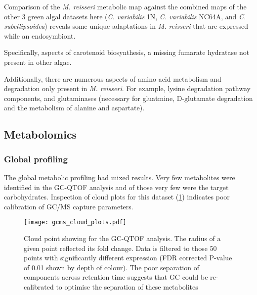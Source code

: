 Comparison of the \textit{M. reisseri} metabolic map against the combined
maps of the other 3 green algal datasets here (\textit{C. variabilis} 1N, 
\textit{C. variabilis} NC64A, and \textit{C. subellipsoidea}) reveals
some unique adaptations in \textit{M. reisseri} that are expressed while 
an endosymbiont.  

Specifically, aspects of carotenoid biosynthesis, a missing fumarate hydratase
not present in other algae.  

Additionally, there are numerous aspects of amino acid metabolism and degradation
only present in \textit{M. reisseri}. For example, lysine degradation pathway components, 
and glutaminases (necessary for gluatmine, D-glutamate degradation and the metabolism of
alanine and aspartate). 

\subsection{Metabolomics} 

\subsubsection{Global profiling}

The global metabolic profiling had mixed results.
Very few metabolites were identified in the GC-QTOF
analysis and of those very few were the target carbohydrates.
Inspection of cloud plots for this dataset (\cref{fig:gcms_clouds})
indicates poor calibration of GC/MS capture parameters. 

\begin{figure}
    \centering
    \texttt{[image: gcms\_cloud\_plots.pdf]}
    \caption[GC-QTOF Cloud Plot]{Cloud point showing for the GC-QTOF analysis. 
    The radius of a given point reflected its fold change.
    Data is filtered to those 50 points with significantly 
different expression (FDR corrected P-value of 0.01 shown by 
depth of colour).  The poor separation of components across
retention time suggests that GC could be re-calibrated to optimise
the separation of these metabolites}
    \label{fig:gcms_clouds}
\end{figure}

